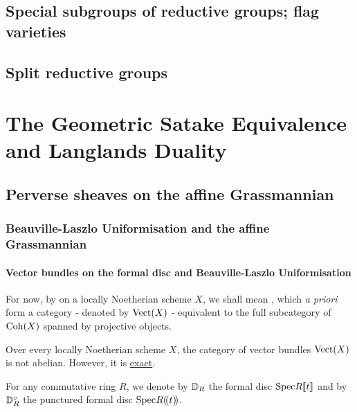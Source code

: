         \subsection{Special subgroups of reductive groups; flag varieties}
        
        \subsection{Split reductive groups}
        
    \section{The Geometric Satake Equivalence and Langlands Duality}
        \subsection{Perverse sheaves on the affine Grassmannian}
            \subsubsection{Beauville-Laszlo Uniformisation and the affine Grassmannian}
                \paragraph{Vector bundles on the formal disc and Beauville-Laszlo Uniformisation}
                    \begin{convention}
                        For now, by  on a locally Noetherian scheme $X$, we shall mean , which \textit{a priori} form a category - denoted by $\mathrm{Vect}(X)$ - equivalent to the full subcategory of $\mathrm{Coh}(X)$ spanned by projective objects. 
                    \end{convention}
                    \begin{remark}
                        Over every locally Noetherian scheme $X$, the category of vector bundles $\mathrm{Vect}(X)$ is not abelian. However, it is \href{https://ncatlab.org/nlab/show/exact+category}{\underline{exact}}.
                    \end{remark}
                    
                    \begin{convention}
                        For any commutative ring $R$, we denote by $\mathbb{D}_R$ the formal disc $\mathrm{Spec} R[\![t]\!]$ and by $\mathbb{D}_R^{\circ}$ the punctured formal disc $\mathrm{Spec} R(\!(t)\!)$.
                    \end{convention}
                    
